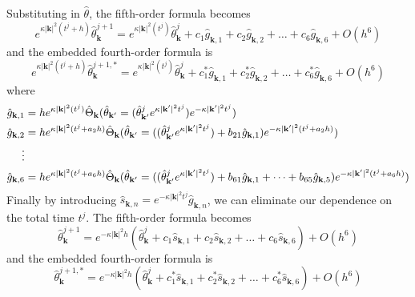 \documentclass[12pt]{article}
\begin{document}
Substituting in $\hat{\theta}$, the fifth-order formula becomes
\begin{equation}
e^{\kappa |\mathbf{k}|^{2}(t^{j}+h)}\hat{\theta}_{\mathbf{k}}^{j+1}=e^{\kappa |\mathbf{k}|^{2}(t^{j})}\hat{\theta}_{\mathbf{k}}^{j}+ c_{1}\hat{g}_{\mathbf{k},1}  + c_{2}\hat{g}_{\mathbf{k},2} + \dots +  c_{6}\hat{g}_{\mathbf{k},6}  + O(h^{6})
\end{equation}
and the embedded fourth-order formula is
\begin{equation}
e^{\kappa |\mathbf{k}|^{2}(t^{j}+h)}\hat{\theta}_{\mathbf{k}}^{j+1,*}=e^{\kappa |\mathbf{k}|^{2}(t^{j})}\hat{\theta}_{\mathbf{k}}^{j}+ c_{1}^{*}\hat{g}_{\mathbf{k},1}  + c_{2}^{*}\hat{g}_{\mathbf{k},2} + \dots +  c_{6}^{*}\hat{g}_{\mathbf{k},6}  + O(h^{6})
\end{equation}
where
\begin{subequations}
	\begin{align}
		\hat{g}_{\mathbf{k},1} & = h e^{\kappa |\mathbf{k}|^{2}(t^{j})}\hat{\Theta}_{\mathbf{k}}(\hat{\theta}_{\mathbf{k}'}=(\hat{\theta}_{\mathbf{k}'}^{j}e^{\kappa |\mathbf{k}'|^{2}t^{j}})e^{-\kappa |\mathbf{k}'|^{2}t^{j}}) \\
		\hat{g}_{\mathbf{k},2} & = h e^{\kappa |\mathbf{k}|^{2}(t^{j}+a_{2}h)}\hat{\Theta}_{\mathbf{k}}(\hat{\theta}_{\mathbf{k}'}=((\hat{\theta}_{\mathbf{k}'}^{j}e^{\kappa |\mathbf{k}'|^{2}t^{j}}) + b_{21}\hat{g}_{\mathbf{k},1}  ) e^{-\kappa |\mathbf{k}'|^{2}(t^{j}+a_{2}h)})\\
		\notag
		\vdots \\
		\hat{g}_{\mathbf{k},6} & = h e^{\kappa |\mathbf{k}|^{2}(t^{j}+a_{6}h)}\hat{\Theta}_{\mathbf{k}}(\hat{\theta}_{\mathbf{k}'}=((\hat{\theta}_{\mathbf{k}'}^{j}e^{\kappa |\mathbf{k}'|^{2}t^{j}})+ b_{61}\hat{g}_{\mathbf{k},1}  + \dots +    b_{65}\hat{g}_{\mathbf{k},5} ) e^{-\kappa |\mathbf{k}'|^{2}(t^{j}+a_{6}h)})
	\end{align}
\end{subequations}
Finally by introducing $\hat{s}_{\mathbf{k},n}=e^{-\kappa |\mathbf{k}|^{2}t^{j}}\hat{g}_{\mathbf{k},n}$, we can eliminate our dependence on the total time $t^j$.  The fifth-order formula becomes
\begin{equation}
\label{eq:fifthorder}
\hat{\theta}_{\mathbf{k}}^{j+1}=e^{-\kappa |\mathbf{k}|^{2}h}(\hat{\theta}_{\mathbf{k}}^{j}+ c_{1}\hat{s}_{\mathbf{k},1}  + c_{2}\hat{s}_{\mathbf{k},2} + \dots +  c_{6}\hat{s}_{\mathbf{k},6})  + O(h^{6})
\end{equation}
and the embedded fourth-order formula is
\begin{equation}
\label{eq:fourthorder}
\hat{\theta}_{\mathbf{k}}^{j+1,*}=e^{-\kappa |\mathbf{k}|^{2}h}(\hat{\theta}_{\mathbf{k}}^{j}+  c_{1}^{*}\hat{s}_{\mathbf{k},1}  + c_{2}^{*}\hat{s}_{\mathbf{k},2} + \dots +  c_{6}^{*}\hat{s}_{\mathbf{k},6})  + O(h^{6})
\end{equation}
\end{document}
